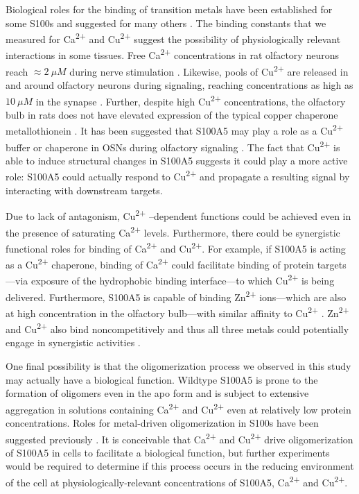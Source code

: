 Biological roles for the binding of transition metals have been established
for some S100s and suggested for many others \cite{moroz_role_2010,gilston_binding_2016,damo_molecular_2013,koch_implications_2007,sivaraja_copper_2006}.
The binding constants that we measured for Ca\textsuperscript{2+} 
and Cu\textsuperscript{2+} suggest the possibility of physiologically
relevant interactions in some tissues. Free Ca\textsuperscript{2+} 
concentrations in rat olfactory neurons reach $\approx2\ \mu M$ during
nerve stimulation \cite{reisert_ca-activated_2003}. Likewise, pools
of Cu\textsuperscript{2+} are released in and around olfactory neurons
during signaling, reaching concentrations as high as $10\ \mu M$
in the synapse \cite{gardner_metal_2017,herms_evidence_1999,hopt_methods_2003,horning_zinc_2001}.
Further, despite high Cu\textsuperscript{2+} concentrations, the
olfactory bulb in rats does not have elevated expression of the typical
copper chaperone metallothionein \cite{ono_regional_1999}. It has
been suggested that S100A5 may play a role as a Cu\textsuperscript{2+} 
buffer or chaperone in OSNs during olfactory signaling \cite{schafer_brain_2000}.
The fact that Cu\textsuperscript{2+} is able to induce structural
changes in S100A5 suggests it could play a more active role: S100A5
could actually respond to Cu\textsuperscript{2+} and propagate a
resulting signal by interacting with downstream targets. 

Due to lack of antagonism, Cu\textsuperscript{2+} –dependent functions
could be achieved even in the presence of saturating Ca\textsuperscript{2+} levels.
Furthermore, there could be synergistic functional roles for binding
of Ca\textsuperscript{2+} and Cu\textsuperscript{2+}. For example,
if S100A5 is acting as a Cu\textsuperscript{2+} chaperone, binding
of Ca\textsuperscript{2+} could facilitate binding of protein targets---via
exposure of the hydrophobic binding interface---to which Cu\textsuperscript{2+} 
is being delivered. Furthermore, S100A5 is capable of binding Zn\textsuperscript{2+} 
ions---which are also at high concentration in the olfactory bulb---with
similar affinity to Cu\textsuperscript{2+} \cite{horning_zinc_2001}.
Zn\textsuperscript{2+} and Cu\textsuperscript{2+} also bind noncompetitively
and thus all three metals could potentially engage in synergistic
activities \cite{wheeler_multiple_2016}. 

One final possibility is that the oligomerization process we observed
in this study may actually have a biological function. Wildtype S100A5
is prone to the formation of oligomers even in the apo form and is
subject to extensive aggregation in solutions containing Ca\textsuperscript{2+} 
and Cu\textsuperscript{2+} even at relatively low protein concentrations.
Roles for metal-driven oligomerization in S100s have been suggested
previously \cite{donato_functions_2013,streicher_modulation_2010,gribenko_oligomerization_1998,moroz_crystal_2009}.
It is conceivable that Ca\textsuperscript{2+} and Cu\textsuperscript{2+} drive
oligomerization of S100A5 in cells to facilitate a biological function,
but further experiments would be required to determine if this process
occurs in the reducing environment of the cell at physiologically-relevant
concentrations of S100A5, Ca\textsuperscript{2+} and Cu\textsuperscript{2+}.

